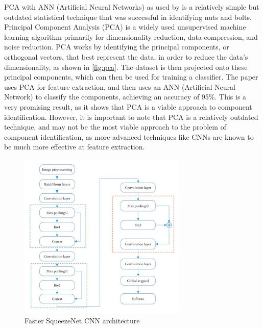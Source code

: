 PCA with ANN (Artificial Neural Networks) as used by \citet{Dhenge2013MechanicalNS} is a relatively simple but outdated statistical technique that was successful in identifying nuts and bolts. Principal Component Analysis (PCA) is a widely used unsupervised machine learning algorithm primarily for dimensionality reduction, data compression, and noise reduction. PCA works by identifying the principal components, or orthogonal vectors, that best represent the data, in order to reduce the data's dimensionality, as shown in \autoref{fig:pca}. The dataset is then projected onto these principal components, which can then be used for training a classifier. The paper uses PCA for feature extraction, and then uses an ANN (Artificial Neural Network) to classify the components, achieving an accuracy of 95\%. This is a very promising result, as it shows that PCA is a viable approach to component identification. However, it is important to note that PCA is a relatively outdated technique, and may not be the most viable approach to the problem of component identification, as more advanced techniques like CNNs are known to be much more effective at feature extraction.

\begin{figure}[H]
  \hfill
  \begin{minipage}[t]{\textwidth}
    \centering
    \includegraphics[height=8cm]{imgs/articles/squeezenet.jpg}
    \caption{Faster SqueezeNet CNN architecture \cite{Xu2020}}
    \label{fig:pca}
  \end{minipage}
\end{figure}

